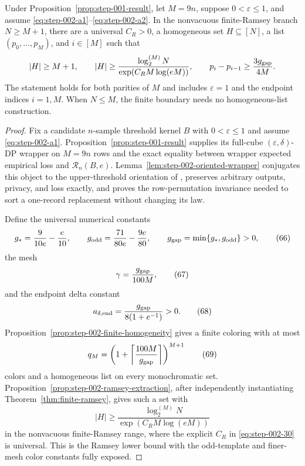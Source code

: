 \begin{proposition}
\label{prop:step-002-result}
Under Proposition~\ref{prop:step-001-result}, let $M=9n$, suppose
$0<\varepsilon\leq1$, and assume \eqref{eq:step-002-a1}--\eqref{eq:step-002-a2}.  In the
nonvacuous finite-Ramsey branch $N\geq M+1$, there are a universal
$C_R>0$, a homogeneous set $H\subseteq[N]$, a list
$(p_0,\ldots,p_M)$, and $i\in[M]$ such that
\[
|H|\geq M+1,\qquad
|H|\geq\frac{\log_2^{(M)}N}{\exp(C_RM\log(eM))},
\qquad
p_i-p_{i-1}\geq\frac{3g_{\rm gap}}{4M}.
\]
The statement holds for both parities of $M$ and includes
$\varepsilon=1$ and the endpoint indices $i=1,M$.  When $N\leq M$,
the finite boundary needs no homogeneous-list construction.
\end{proposition}
\begin{proof}

Fix a candidate \(n\)-sample threshold kernel \(B\) with \(0<\varepsilon\le 1\) and assume \eqref{eq:step-002-a1}. Proposition~\ref{prop:step-001-result} supplies its full-cube \((\varepsilon,\delta)\)-DP wrapper on \(M=9n\) rows and the exact equality between wrapper expected empirical loss and \(\mathcal R_n(B,e)\). Lemma~\ref{lem:step-002-oriented-wrapper} conjugates this object to the upper-threshold orientation of \citet{alonEtAl2018private}, preserves arbitrary outputs, privacy, and loss exactly, and proves the row-permutation invariance needed to sort a one-record replacement without changing its law.

Define the universal numerical constants
\[
g_* = \frac9{10e}-\frac e{10},
\qquad
g_{\rm odd}=\frac{71}{80e}-\frac{9e}{80},
\qquad
g_{\rm gap}=\min\{g_*,g_{\rm odd}\}>0,
\tag{66}\label{eq:step-002-66}
\]
the mesh
\[
\gamma=\frac{g_{\rm gap}}{100M},
\tag{67}\label{eq:step-002-67}
\]
and the endpoint delta constant
\[
a_{\delta,{\rm end}}
=\frac{g_{\rm gap}}{8(1+e^{-1})}>0.
\tag{68}\label{eq:step-002-68}
\]
Proposition~\ref{prop:step-002-finite-homogeneity} gives a finite coloring with at most
\[
q_M=\left(1+\left\lceil\frac{100M}{g_{\rm gap}}\right\rceil\right)^{M+1}
\tag{69}\label{eq:step-002-69}
\]
colors and a homogeneous list on every monochromatic set. Proposition~\ref{prop:step-002-ramsey-extraction}, after independently instantiating Theorem~\ref{thm:finite-ramsey}, gives such a set with
\[
|H|\ge
\frac{\log_2^{(M)}N}{\exp(C_RM\log(eM))}
\tag{70}\label{eq:step-002-70}
\]
in the nonvacuous finite-Ramsey range, where the explicit \(C_R\) in \eqref{eq:step-002-30} is universal. This is the Ramsey lower bound with the odd-template and finer-mesh color constants fully exposed.


\end{proof}
